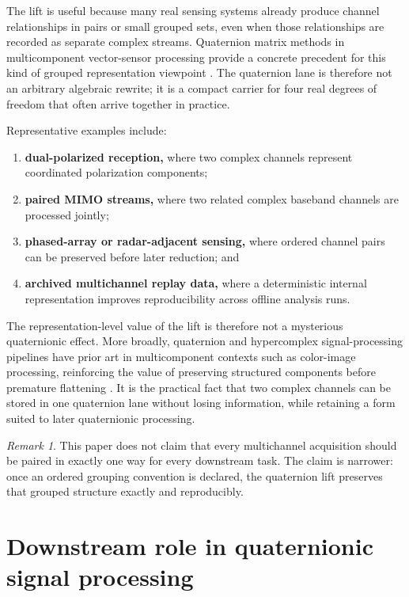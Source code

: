 \documentclass[11pt]{article}
\theoremstyle{remark}
\newtheorem{remark}[definition]{Remark}
\begin{document}
The lift is useful because many real sensing systems already produce channel relationships in pairs or small grouped sets, even when those relationships are recorded as separate complex streams. Quaternion matrix methods in multicomponent vector-sensor processing provide a concrete precedent for this kind of grouped representation viewpoint \citep{lebihan2004}. The quaternion lane is therefore not an arbitrary algebraic rewrite; it is a compact carrier for four real degrees of freedom that often arrive together in practice.

Representative examples include:
\begin{enumerate}[label=(\arabic*)]
    \item \textbf{dual-polarized reception,} where two complex channels represent coordinated polarization components;
    \item \textbf{paired MIMO streams,} where two related complex baseband channels are processed jointly;
    \item \textbf{phased-array or radar-adjacent sensing,} where ordered channel pairs can be preserved before later reduction; and
    \item \textbf{archived multichannel replay data,} where a deterministic internal representation improves reproducibility across offline analysis runs.
\end{enumerate}

The representation-level value of the lift is therefore not a mysterious quaternionic effect. More broadly, quaternion and hypercomplex signal-processing pipelines have prior art in multicomponent contexts such as color-image processing, reinforcing the value of preserving structured components before premature flattening \citep{ell2007}. It is the practical fact that two complex channels can be stored in one quaternion lane without losing information, while retaining a form suited to later quaternionic processing.

\begin{remark}
This paper does not claim that every multichannel acquisition should be paired in exactly one way for every downstream task. The claim is narrower: once an ordered grouping convention is declared, the quaternion lift preserves that grouped structure exactly and reproducibly.
\end{remark}

\section{Downstream role in quaternionic signal processing}
\end{document}

